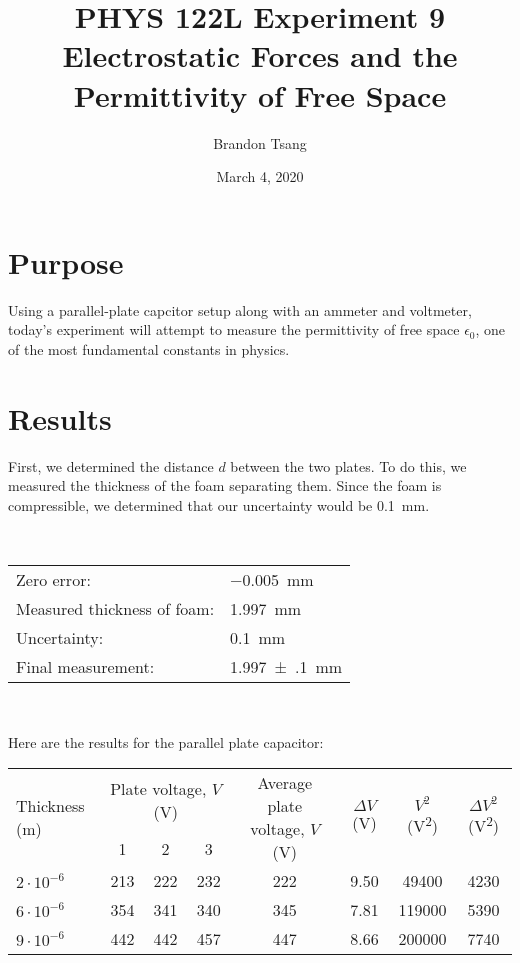 \documentclass[11pt]{article}
\title{
    PHYS 122L Experiment 9 \\
    \Large Electrostatic Forces and the Permittivity of Free Space
}
\author{Brandon Tsang}
\date{March 4, 2020}
\begin{document}
    \maketitle
    \section*{Purpose}
        Using a parallel-plate capcitor setup along with an ammeter and voltmeter, today's experiment will attempt to measure the permittivity of free space $\epsilon_0$, one of the most fundamental constants in physics.
    \section*{Results}
        First, we determined the distance $d$ between the two plates. To do this, we measured the thickness of the foam separating them. Since the foam is compressible, we determined that our uncertainty would be \SI{0.1}{\milli\meter}.
        {
        \raggedright
        \\[12pt]
        \begin{tabular}{l l}
            Zero error: & \SI{-0.005}{\milli\meter} \\
            Measured thickness of foam: & \SI{1.997}{\milli\meter} \\
            Uncertainty: & \SI{0.1}{\milli\meter} \\
            Final measurement: & \SI{1.997(100)}{\milli\meter}
        \end{tabular}
        \\[8pt]
        }
        \par\noindent
        Here are the results for the parallel plate capacitor:
        \begin{center}
            \begin{tabular}{l c c c c c c c}
                \toprule
                \multirow{2}{*}{Thickness (\si{\meter})} & \multicolumn{3}{c}{Plate voltage, $V$ (\si{\volt})} & \multirow{2}{*}{Average plate voltage, $V$ (\si{\volt})} & \multirow{2}{*}{$\Delta V$ (\si{\volt})} & \multirow{2}{*}{$V^2$ (\si{\volt\squared})} & \multirow{2}{*}{$\Delta V^2$ (\si{\volt\squared})} \\
                & 1 & 2 & 3 \\
                \midrule
                $2\cdot10^{-6}$ & 213 & 222 & 232 & 222 & 9.50 & 49400 & 4230 \\
                $6\cdot10^{-6}$ & 354 & 341 & 340 & 345 & 7.81 & 119000 & 5390 \\
                $9\cdot10^{-6}$ & 442 & 442 & 457 & 447 & 8.66 & 200000 & 7740 \\
                \bottomrule
            \end{tabular}
        \end{center}
\end{document}
